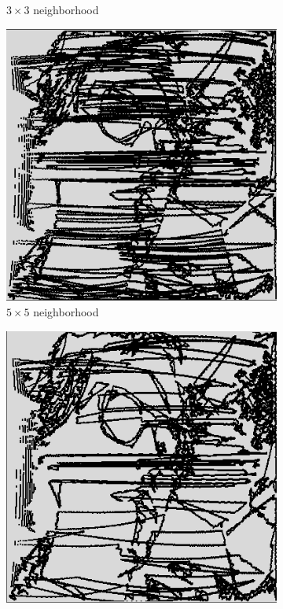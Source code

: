\begin{figure}[t]
\begin{subfigure}[t]{.15\textwidth}
        \caption{$3\times3$ neighborhood}
        \label{subfig:3x3}
    \end{subfigure}
    \begin{subfigure}[t]{.15\textwidth}
        \includegraphics[width=\textwidth]{Images/segmented_v2_5x5_neighborhood.png}
        \caption{$5\times5$ neighborhood}
        \label{subfig:5x5}
    \end{subfigure}
    \begin{subfigure}[t]{.15\textwidth}
        \includegraphics[width=\textwidth]{Images/segmented_v3_7x7_neighborhood.png}

\end{subfigure}
\end{figure}
